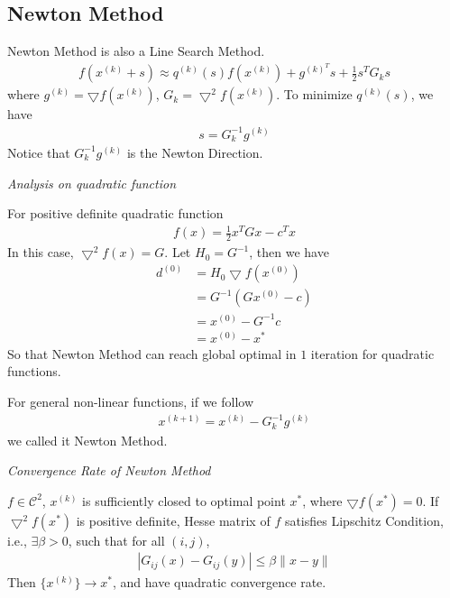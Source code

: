 \subsection{Newton Method}

Newton Method is also a Line Search Method.
\begin{align}
    f(x^{(k)} + s) \approx q^{(k)}(s) f(x^{(k)}) + g^{(k)^T} s
     + \frac{1}{2} s^T G_k s
\end{align}
where $g^{(k)} = \bigtriangledown f(x^{(k)})$,
$G_k = \bigtriangledown^2 f(x^{(k)})$.
To minimize $q^{(k)}(s)$, we have
\begin{align}
    s = G_k^{-1} g^{(k)}
\end{align}
Notice that $G_k^{-1} g^{(k)}$ is the Newton Direction.
\par
\vspace{.3em}
\noindent\textit{Analysis on quadratic function}
\par
For positive definite quadratic function
\begin{align}
    f(x) = \frac{1}{2} x^TGx - c^Tx
\end{align}
In this case, $\bigtriangledown^2 f(x) = G$.
Let $H_0 = G^{-1}$, then we have
\begin{align}
    d^{(0)} &= H_0 \bigtriangledown f(x^{(0)}) \\
    &= G^{-1} (Gx^{(0)} - c) \\
    &= x^{(0)} - G^{-1}c \\
    &= x^{(0)} - x^*
\end{align}
So that Newton Method can reach global optimal
in $1$ iteration for quadratic functions.
\par
For general non-linear functions, if we follow
\begin{align}
    x^{(k+1)} = x^{(k)} - G_k^{-1} g^{(k)}
\end{align}
we called it Newton Method.
\par
\vspace{.3em}
\noindent\textit{Convergence Rate of Newton Method}
\begin{theorem}
    $f \in \mathcal{C}^2$, $x^{(k)}$ is sufficiently closed
    to optimal point $x^*$, where $\bigtriangledown f(x^*) = 0$.
    If $\bigtriangledown^2 f(x^*)$ is positive definite, 
    Hesse matrix of $f$ satisfies Lipschitz Condition, i.e.,
    $\exists \beta >0$, such that for all $(i, j)$,
    \begin{align}
        | G_{ij}(x) - G_{ij}(y)| \leq \beta \parallel x - y \parallel
    \end{align}
    Then $\{x^{(k)}\} \rightarrow x^*$, and have quadratic
    convergence rate.
\end{theorem}
